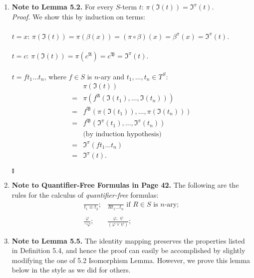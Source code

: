 \begin{enumerate}[1.]
\item \textbf{Note to Lemma 5.2.} For every $S$-term $t$: $\pi(\mathfrak{I}(t)) = \mathfrak{I}^\pi(t)$.\\
\textit{Proof.} We show this by induction on terms:\\
\ 
\\$t = x$: $\pi(\mathfrak{I}(t)) = \pi(\beta(x)) = (\pi \circ \beta)(x) = \beta^\pi(x) = \mathfrak{I}^\pi(t)$.\\
\ 
\\$t = c$: $\pi(\mathfrak{I}(t)) = \pi(c^{\mathfrak{A}}) = c^{\mathfrak{B}} = \mathfrak{I}^\pi(t)$.\\
\ 
\\$t = ft_1 \ldots t_n$, where $f \in S$ is $n$-ary and $t_1 , \ldots , t_n \in T^S$:
\[
\begin{array}{ll}
\,  & \pi(\mathfrak{I}(t)) \\
= & \pi(f^{\mathfrak{A}} ( \mathfrak{I}(t_1) , \ldots , \mathfrak{I}(t_n) ) ) \\
= & f^{\mathfrak{B}}(\pi (\mathfrak{I}(t_1)) , \ldots , \pi (\mathfrak{I}(t_n)) ) \\
= & f^{\mathfrak{B}}( \mathfrak{I}^\pi(t_1) , \ldots , \mathfrak{I}^\pi(t_n) ) \\
\,  & \mbox{(by induction hypothesis)} \\
= & \mathfrak{I}^\pi ( ft_1 \ldots t_n ) \\
= & \mathfrak{I}^\pi (t) .
\end{array}
\] \begin{flushright}$\talloblong$\end{flushright}
%
\item \textbf{Note to Quantifier-Free Formulas in Page 42.} The following are the rules for the calculus of \textit{quantifier-free} formulas:
\[
\begin{array}{ll}
\displaystyle \frac{\,}{t_1 \equiv t_2}; & \displaystyle \frac{\,}{Rt_1 \ldots t_n} \mbox{ if $R \in S$ is $n$-ary}; \\
\,  & \,  \\
\displaystyle \frac{\varphi}{\neg \varphi}; & \displaystyle \frac{\varphi , \; \psi}{( \varphi \lor \psi )};
\end{array}
\]
%
\item \textbf{Note to Lemma 5.5.} The identity mapping preserves the properties listed in Definition 5.4, and hence the proof can easily be accomplished by slightly modifying the one of 5.2 Isomorphism Lemma. However, we prove this lemma below in the style as we did for others.\\

\end{enumerate}
